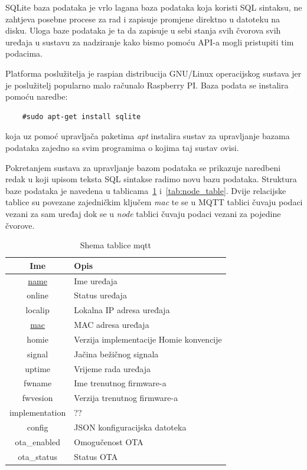 \documentclass[times, utf8, zavrsni]{fer}
\begin{document}
SQLite baza podataka je vrlo lagana baza podataka koja koristi SQL sintaksu, ne zahtjeva posebne procese za rad i zapisuje promjene direktno u datoteku na disku.
Uloga baze podataka je ta da zapisuje u sebi stanja svih čvorova svih uređaja u sustavu za nadziranje kako bismo pomoću API-a mogli pristupiti tim podacima.

Platforma poslužitelja je raspian distribucija GNU/Linux operacijskog sustava jer je poslužitelj popularno malo računalo Raspberry PI.
Baza podata se instalira pomoću naredbe:
\begin{lstlisting}
    #sudo apt-get install sqlite
\end{lstlisting}
koja uz pomoć upravljača paketima \textit{apt} instalira sustav za upravljanje bazama podataka zajedno sa svim programima o kojima taj sustav ovisi.

Pokretanjem sustava za upravljanje bazom podataka se prikazuje naredbeni redak u koji upisom teksta SQL sintakse radimo novu
bazu podataka.
Struktura baze podataka je navedena u tablicama~\ref{tab:mqtt_table} i~\ref{tab:node_table}.
Dvije relacijske tablice su povezane zajedničkim ključem \textit{mac} te se u MQTT tablici čuvaju podaci vezani za sam uređaj dok se u \textit{node} tablici čuvaju podaci vezani za pojedine čvorove.
\begin{table}[H]
    \centering
    \begin{tabular}{ |c|l| }
        \hline
        Ime & Opis \\
        \hline
        \underline{name} & Ime uređaja\\
        \hline
        online & Status uređaja\\
        \hline
        localip & Lokalna IP adresa uređaja\\
        \hline
        \underline{mac} & MAC adresa uređaja\\
        \hline
        homie & Verzija implementacije Homie konvencije\\
        \hline
        signal & Jačina bežičnog signala\\
        \hline
        uptime & Vrijeme rada uređaja\\
        \hline
        fwname & Ime trenutnog firmware-a\\
        \hline
        fwvesion & Verzija trenutnog firmware-a\\
        \hline
        implementation & ??\\
        \hline
        config & JSON konfiguracijska datoteka\\
        \hline
        ota\_enabled & Omogučenost OTA\\
        \hline
        ota\_status & Status OTA\\
        \hline
    \end{tabular}
    \caption{Shema tablice mqtt}\label{tab:mqtt_table}
\end{table}
\end{document}
